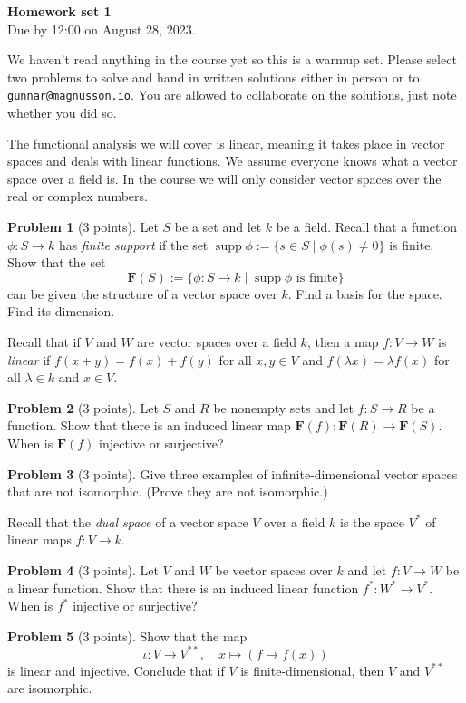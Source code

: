 \documentclass[11pt]{article}
\theoremstyle{definition}
\newtheorem{prob}{Problem}
\newcommand{\kk}[1]{\mathbf{#1}}
\DeclareMathOperator{\supp}{supp}
\def\head{
\begin{center}
\textbf{\LARGE Homework set 1}
\\[3pt]
Due by 12:00 on August 28, 2023.
\end{center}
\medskip
}
\begin{document}
\head

We haven't read anything in the course yet so this is a warmup set.
Please select two problems to solve and hand in written solutions either in person or to \verb+gunnar@magnusson.io+.
You are allowed to collaborate on the solutions, just note whether you did so.

The functional analysis we will cover is linear, meaning it takes place
in vector spaces and deals with linear functions.
We assume everyone knows what a vector space over a field is.
In the course we will only consider vector spaces over the real or complex numbers.


\begin{prob}[3 points]
Let $S$ be a set and let $k$ be a field.
Recall that a function $\phi : S \to k$ has \emph{finite support} if the
set $\supp \phi := \{ s \in S \mid \phi(s) \not= 0 \}$ is finite.
Show that the set
\[
\kk F(S) :=
\{ \phi : S \to k \mid \text{$\supp \phi$ is finite} \}
\]
can be given the structure of a vector space over $k$.
Find a basis for the space.
Find its dimension.
\end{prob}

Recall that if $V$ and $W$ are vector spaces over a field $k$, then a map
$f : V \to W$ is \emph{linear} if $f(x + y) = f(x) + f(y)$ for all $x, y \in V$
and $f(\lambda x) = \lambda f(x)$ for all $\lambda \in k$ and $x \in V$.

\begin{prob}[3 points]
Let $S$ and $R$ be nonempty sets and let $f : S \to R$ be a function.
Show that there is an induced linear map $\kk F(f) : \kk F(R) \to \kk F(S)$.
When is $\kk F(f)$ injective or surjective?
\end{prob}


\begin{prob}[3 points]
Give three examples of infinite-dimensional vector spaces that are not isomorphic.
(Prove they are not isomorphic.)
\end{prob}

Recall that the \emph{dual space} of a vector space $V$ over a field $k$ is the
space $V^*$ of linear maps $f : V \to k$.

\begin{prob}[3 points]
Let $V$ and $W$ be vector spaces over $k$ and let $f : V \to W$ be a linear function.
Show that there is an induced linear function $f^* : W^* \to V^*$.
When is $f^*$ injective or surjective?
\end{prob}

\begin{prob}[3 points]
Show that the map
\[
\iota : V \to V^{**},
\quad
x \mapsto (f \mapsto f(x))
\]
is linear and injective.
Conclude that if $V$ is finite-dimensional, then $V$ and $V^{**}$ are isomorphic.
\end{prob}
\end{document}
